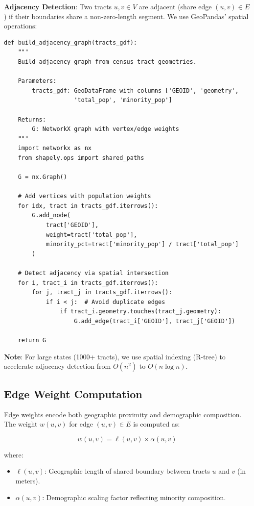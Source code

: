 \textbf{Adjacency Detection}: Two tracts $u, v \in V$ are adjacent (share edge $(u,v) \in E$) if their boundaries share a non-zero-length segment. We use GeoPandas' spatial operations:

\begin{verbatim}
def build_adjacency_graph(tracts_gdf):
    """
    Build adjacency graph from census tract geometries.

    Parameters:
        tracts_gdf: GeoDataFrame with columns ['GEOID', 'geometry',
                    'total_pop', 'minority_pop']

    Returns:
        G: NetworkX graph with vertex/edge weights
    """
    import networkx as nx
    from shapely.ops import shared_paths

    G = nx.Graph()

    # Add vertices with population weights
    for idx, tract in tracts_gdf.iterrows():
        G.add_node(
            tract['GEOID'],
            weight=tract['total_pop'],
            minority_pct=tract['minority_pop'] / tract['total_pop']
        )

    # Detect adjacency via spatial intersection
    for i, tract_i in tracts_gdf.iterrows():
        for j, tract_j in tracts_gdf.iterrows():
            if i < j:  # Avoid duplicate edges
                if tract_i.geometry.touches(tract_j.geometry):
                    G.add_edge(tract_i['GEOID'], tract_j['GEOID'])

    return G
\end{verbatim}

\textbf{Note}: For large states (1000+ tracts), we use spatial indexing (R-tree) to accelerate adjacency detection from $O(n^2)$ to $O(n \log n)$.

\subsection{Edge Weight Computation}

Edge weights encode both geographic proximity and demographic composition. The weight $w(u,v)$ for edge $(u,v) \in E$ is computed as:

\[
w(u,v) = \ell(u,v) \times \alpha(u,v)
\]

where:
\begin{itemize}
    \item $\ell(u,v)$: Geographic length of shared boundary between tracts $u$ and $v$ (in meters).
    \item $\alpha(u,v)$: Demographic scaling factor reflecting minority composition.
\end{itemize}


